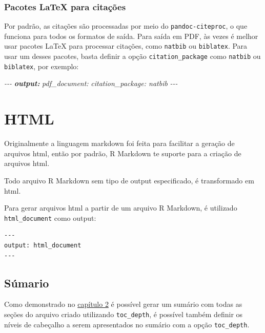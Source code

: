 \documentclass[
]{book}
\newenvironment{Shaded}{\begin{snugshade}}{\end{snugshade}}
\newcommand{\AnnotationTok}[1]{\textcolor[rgb]{0.56,0.35,0.01}{\textbf{\textit{#1}}}}
\newcommand{\CommentTok}[1]{\textcolor[rgb]{0.56,0.35,0.01}{\textit{#1}}}
\begin{document}
\hypertarget{pacotes-latex-para-citauxe7uxf5es}{%
\subsubsection{Pacotes LaTeX para citações}\label{pacotes-latex-para-citauxe7uxf5es}}

Por padrão, as citações são processadas por meio do \texttt{pandoc-citeproc}, o que funciona para todos os formatos de saída. Para saída em PDF, às vezes é melhor usar pacotes LaTeX para processar citações, como \texttt{natbib} ou \texttt{biblatex}. Para usar um desses pacotes, basta definir a opção \texttt{citation\_package} como \texttt{natbib} ou \texttt{biblatex}, por exemplo:

\begin{Shaded}
\begin{Highlighting}[]
\CommentTok{{-}{-}{-}}
\AnnotationTok{output:}
\CommentTok{  pdf\_document:}
\CommentTok{    citation\_package: natbib}
\CommentTok{{-}{-}{-}}
\end{Highlighting}
\end{Shaded}

\hypertarget{html}{%
\section{HTML}\label{html}}

Originalmente a linguagem markdown foi feita para facilitar a geração de arquivos html, então por padrão, R Markdown te suporte para a criação de arquivos html.

Todo arquivo R Markdown sem tipo de output especificado, é transformado em html.

Para gerar arquivos html a partir de um arquivo R Markdown, é utilizado \texttt{html\_document} como output:

\begin{verbatim}
---
output: html_document
---
\end{verbatim}

\hypertarget{suxfamario}{%
\subsection{Súmario}\label{suxfamario}}

Como demonstrado no \protect\hyperlink{definindo-tipo-de-output}{capítulo 2} é possível gerar um sumário com todas as seções do arquivo criado utilizando \texttt{toc\_depth}, é possível também definir os níveis de cabeçalho a serem apresentados no sumário com a opção \texttt{toc\_depth}.
\end{document}
